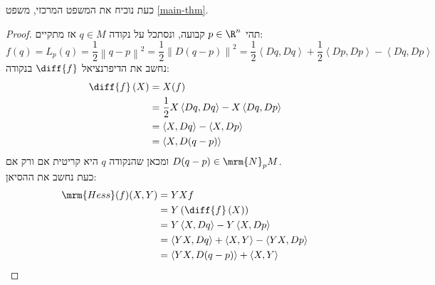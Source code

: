 \documentclass{article}
\theoremstyle{definition}
\newcommand{\norm}[1]{\left\lVert#1\right\rVert}
\begin{document}
	כעת נוכיח את המשפט המרכזי, משפט \ref{main-thm}.
	\begin{proof}
		תהי
		\(p\in\R^n\)
		קבועה, ונסתכל על נקודה
		\(q\in M\)
		אז מתקיים:
		\[
			f(q)
			=L_p(q)
			=\frac{1}{2}\norm{q-p}^2
			=\frac{1}{2}\norm{D(q-p)}^2
			=\frac{1}{2}\left\langle Dq,Dq \right\rangle
			+\frac{1}{2}\left\langle Dp,Dp \right\rangle
			-\left\langle Dq,Dp \right\rangle
		\]
		נחשב את הדיפרנציאל
		\(\diff{f}\)
		בנקודה:
		\begin{equation*}\begin{split}
			\diff{f}\left(X\right)
			&=X(f)
			\\&=\frac{1}{2}X\left\langle Dq,Dq \right\rangle
			-X\left\langle Dq,Dp \right\rangle
			\\&=\left\langle X,Dq \right\rangle
			-\left\langle X,Dp \right\rangle
			\\&=\left\langle X,D(q-p) \right\rangle
		\end{split}\end{equation*}
		ומכאן שהנקודה \(q\) היא קריטית אם ורק אם
		\(D(q-p)\in \mrm{N}_p M\).
		\\
		כעת נחשב את ההסיאן:
		\begin{equation*}\begin{split}
			\mrm{Hess}(f)(X,Y)
			&=YXf
			\\&=Y\left(\diff{f}\left(X\right)\right)
			\\&=Y\left\langle X,Dq \right\rangle
			-Y\left\langle X,Dp \right\rangle
			\\&=\left\langle YX,Dq \right\rangle
			+\left\langle X,Y \right\rangle
			-\left\langle YX,Dp \right\rangle
			\\&=\left\langle YX,D(q-p) \right\rangle
			+\left\langle X,Y \right\rangle
		\end{split}\end{equation*}
	\end{proof}
	
\end{document}
